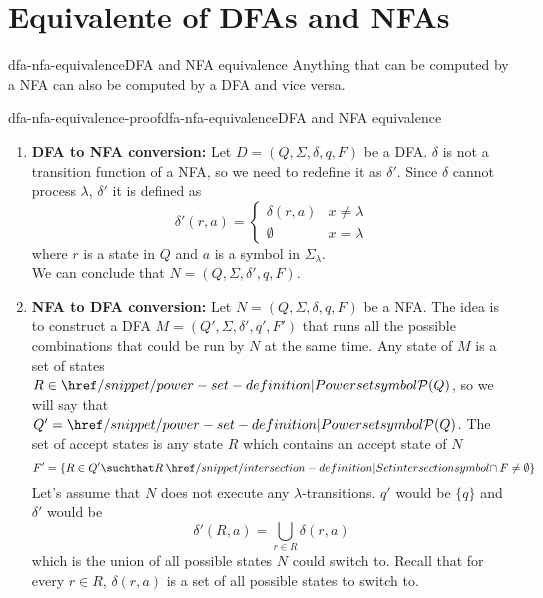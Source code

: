 \documentclass[preview]{standalone}
\newcommand{\emptyString}{\lambda}
\begin{document}
\genpage


\section{Equivalente of DFAs and NFAs}

\begin{snippettheorem}{dfa-nfa-equivalence}{DFA and NFA equivalence}
    Anything that can be computed by a NFA can also be computed by a DFA and vice versa.
\end{snippettheorem}

\begin{snippetproof}{dfa-nfa-equivalence-proof}{dfa-nfa-equivalence}{DFA and NFA equivalence}
    \begin{enumerate}
        \item \textbf{DFA to NFA conversion:}
        Let \(D=(Q, \Sigma, \delta, q, F)\) be a DFA.
        \(\delta\) is not a transition function of a NFA, so we need to redefine it as \(\delta'\).
        Since \(\delta\) cannot process \(\emptyString\), \(\delta'\)
        it is defined as
        \[
            \delta'(r, a)=
            \begin{cases} 
                \delta(r, a) & x \neq \emptyString \\
                \emptyset & x = \emptyString
            \end{cases}
        \]
        where \(r\) is a state in \(Q\) and \(a\) is a symbol in \(\Sigma_\emptyString\). \\
        We can conclude that \(N=(Q, \Sigma, \delta', q, F)\).
        \item \textbf{NFA to DFA conversion:}
        Let \(N=(Q, \Sigma, \delta, q, F)\) be a NFA. The idea is to construct a DFA \(M=(Q', \Sigma, \delta', q', F')\)
        that runs all the possible combinations that could be run by \(N\) at the same time.
        Any state of \(M\) is a set of states \(R \in \powerset(Q)\), so we will say that
        \(Q'=\powerset(Q)\). The set of accept states is any state \(R\) which contains an accept
        state of \(N\)
        \[
            F' = \{R \in Q' \suchthat R \intersection F \neq \emptyset\}
        \]
        Let's assume that \(N\) does not execute any \(\emptyString\)-transitions.
        \(q'\) would be \(\{q\}\) and \(\delta'\) would be
        \[
            \delta'(R, a) = \bigcup_{r\in R}\delta(r,a)
        \]
        which is the union of all possible states \(N\) could switch to.
        Recall that for every \(r\in R\), \(\delta(r,a)\) is a set
        of all possible states to switch to.
        

\end{enumerate}
\end{snippetproof}
\end{document}
